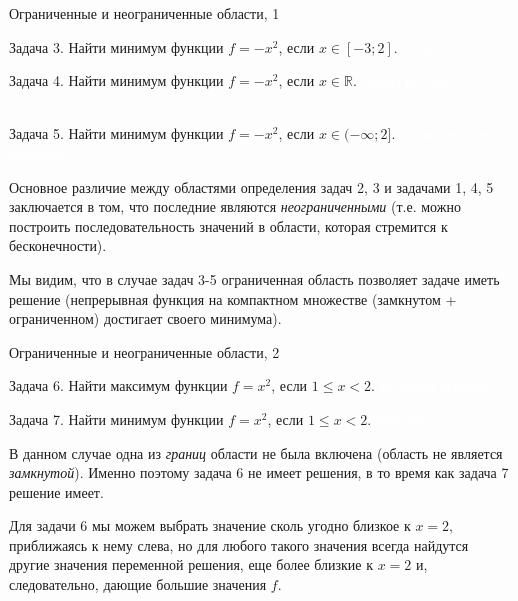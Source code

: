\documentclass{beamer}
\begin{document}
\begin{frame}{Ограниченные и неограниченные области, 1}
	\begin{flushleft}
		
		Задача 3. Найти минимум функции $f = -x^2$, если $x \in [-3 ; 2]$. \textcolor{white}{Решение: $x = -3$.}
		
		\bigskip
		
		Задача 4. Найти минимум функции $f = -x^2$, если $x \in \mathbb{R}$. \textcolor{white}{Задача не имеет решения.}
		
		\bigskip
		
		Задача 5. Найти минимум функции $f = -x^2$, если $x \in (-\infty ; 2]$. \textcolor{white}{Задача не имеет решения.}
		
		\bigskip
		
		Основное различие между областями определения задач 2, 3 и задачами 1, 4, 5 заключается в том, что последние являются \emph{неограниченными} (т.е. можно построить последовательность значений в области, которая стремится к бесконечности).
		
		\bigskip
		
		Мы видим, что в случае задач 3-5 ограниченная область позволяет задаче иметь решение \textcolor{mygray}{(непрерывная функция на компактном множестве (замкнутом + ограниченном) достигает своего минимума)}.
		
	\end{flushleft}
\end{frame}

\begin{frame}{Ограниченные и неограниченные области, 2}
	\begin{flushleft}
		
		Задача 6. Найти максимум функции $f = x^2$, если $1 \leq x < 2$. \textcolor{white}{Не имеет решения.}
		
		\bigskip
		
		Задача 7. Найти минимум функции $f = x^2$, если $1 \leq x < 2$. \textcolor{white}{Решение: $x = 1$.}
		
		\bigskip
		
		В данном случае одна из \emph{границ} области не была включена (область не является \emph{замкнутой}). Именно поэтому задача 6 не имеет решения, в то время как задача 7 решение имеет.
		
		\bigskip
		
		Для задачи 6 мы можем выбрать значение сколь угодно близкое к $x = 2$, приближаясь к нему слева, но для любого такого значения всегда найдутся другие значения переменной решения, еще более близкие к $x = 2$ и, следовательно, дающие большие значения $f$.
		
	\end{flushleft}
\end{frame}
\end{document}
